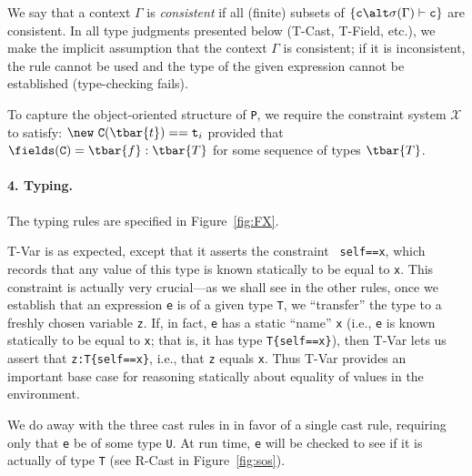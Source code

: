 We say that a context $\Gamma$ is {\em consistent} if all (finite)
subsets of $\{{\tt c}\alt \sigma(\Gamma) \vdash {\tt c}\}$ are consistent.
In all type judgments presented below ({\sc T-Cast}, {\sc T-Field},
etc.), we make the implicit assumption that the context $\Gamma$ is
consistent; if it is inconsistent, the rule cannot be used and the
type of the given expression cannot be established (type-checking
fails).

To capture the object-oriented structure of {\tt P}, we require the constraint system $\mathcal{X}$ to satisfy: $\new~{\tt C}(\tbar{t})=={\tt t}_i$ provided that $\fields({\tt C})=\tbar{f}:\tbar{T}$ for some sequence of types $\tbar{T}$.


\paragraph{4. Typing.} The typing rules are specified in Figure~\ref{fig:FX}.

{\sc T-Var} is as expected, except that it asserts the constraint {\tt
self==x}, which records that any value of this type is known
statically to be equal to {\tt x}. This constraint is actually very
crucial---as we shall see in the other rules, once we establish that
an expression {\tt e} is of a given type {\tt T}, we ``transfer'' the
type to a freshly chosen variable {\tt z}.  If, in fact, {\tt e} has a
static ``name'' {\tt x} (i.e., {\tt e} is known statically to be
equal to {\tt x}; that is, it has type {\tt T\{self==x\}}), then
{\sc T-Var} lets us assert that {\tt z:T\{self==x\}}, i.e., that {\tt z}
equals {\tt x}.
Thus {\sc T-Var} provides an important base case for
reasoning statically about equality of values in the environment.

We do away with the three cast rules in \FJ{} in favor of a single
cast rule, requiring only that {\tt e} be of some type {\tt U}.  At run time,
{\tt e} will be checked to see if it is actually of type {\tt T} (see
{\sc R-Cast} in Figure~\ref{fig:sos}).

